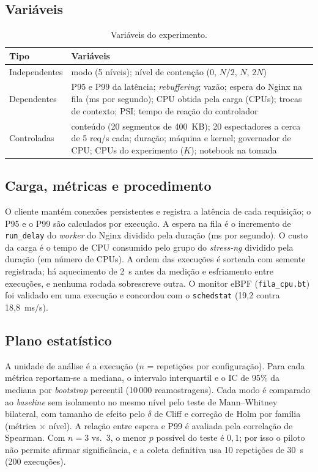 \documentclass[12pt,a4paper]{article}
\begin{document}
\subsection{Variáveis}
\begin{table}[H]
\centering
\caption{Variáveis do experimento.}
\label{tab:variaveis}
\begin{tabularx}{\textwidth}{lX}
\toprule
\textbf{Tipo} & \textbf{Variáveis} \\
\midrule
Independentes & modo (5 níveis); nível de contenção (0, $N/2$, $N$, $2N$) \\
Dependentes & P95 e P99 da latência; \textit{rebuffering}; vazão; espera do Nginx na fila (ms por segundo);
CPU obtida pela carga (CPUs); trocas de contexto; PSI; tempo de reação do controlador \\
Controladas & conteúdo (20 segmentos de 400~KB); 20 espectadores a cerca de 5 req/s cada; duração; máquina e
kernel; governador de CPU; CPUs do experimento ($K$); notebook na tomada \\
\bottomrule
\end{tabularx}
\end{table}

\subsection{Carga, métricas e procedimento}
O cliente mantém conexões persistentes e registra a latência de cada requisição; o P95 e o P99 são calculados
por execução. A espera na fila é o incremento de \texttt{run\_delay} do \textit{worker} do Nginx dividido pela
duração (ms por segundo). O custo da carga é o tempo de CPU consumido pelo grupo do \textit{stress-ng} dividido
pela duração (em número de CPUs). A ordem das execuções é sorteada com semente registrada; há aquecimento de
2~s antes da medição e esfriamento entre execuções, e nenhuma rodada sobrescreve outra. O monitor eBPF
(\texttt{fila\_cpu.bt}) foi validado em uma execução e concordou com o \texttt{schedstat}
(19,2 contra 18,8~ms/s).

\subsection{Plano estatístico}
A unidade de análise é a execução ($n$ = repetições por configuração). Para cada métrica reportam-se a
mediana, o intervalo interquartil e o IC de 95\% da mediana por \textit{bootstrap} percentil
\cite{efron1993bootstrap} (10\,000 reamostragens). Cada modo é comparado ao \textit{baseline} sem isolamento no
mesmo nível pelo teste de Mann--Whitney \cite{mann1947} bilateral, com tamanho de efeito pelo $\delta$ de Cliff
\cite{cliff1993} e correção de Holm \cite{holm1979} por família (métrica $\times$ nível). A relação entre
espera e P99 é avaliada pela correlação de Spearman. Com $n=3$ vs.\ $3$, o menor $p$ possível do teste é
$0{,}1$; por isso o piloto não permite afirmar significância, e a coleta definitiva usa 10 repetições de 30~s
(200 execuções).
\end{document}
